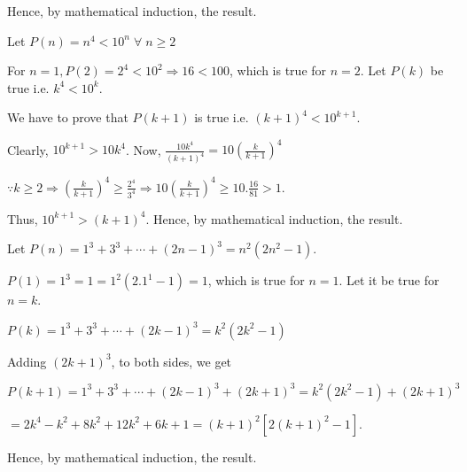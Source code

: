   Hence, by mathematical induction, the result.
\item Let $P(n) = n^4 < 10^n\;\forall\;n\geq 2$

  For $n = 1, P(2) = 2^4 < 10^2 \Rightarrow 16 < 100$, which is true for $n = 2$. Let $P(k)$ be true
  i.e. $k^4 < 10^k$.

  We have to prove that $P(k + 1)$ is true i.e. $(k + 1)^4 < 10^{k + 1}$.

  Clearly, $10^{k + 1} > 10k^4$. Now, $\frac{10k^4}{(k + 1)^4} = 10\left(\frac{k}{k + 1}\right)^4$

  $\because k\geq 2\Rightarrow \left(\frac{k}{k + 1}\right)^4\geq \frac{2^4}{3^4}\Rightarrow
  10\left(\frac{k}{k + 1}\right)^4 \geq 10.\frac{16}{81} > 1$.

  Thus, $10^{k + 1} > (k + 1)^4$. Hence, by mathematical induction, the result.
\item Let $P(n) = 1^3 + 3^3 + \cdots + (2n - 1)^3 = n^2(2n^2 - 1)$.

  $P(1) = 1^3 = 1 = 1^2(2.1^1 - 1) = 1$, which is true for $n = 1$. Let it be true for $n = k$.

  $P(k) = 1^3 + 3^3 + \cdots + (2k - 1)^3 = k^2(2k^2 - 1)$

  Adding $(2k + 1)^3$, to both sides, we get

  $P(k + 1) = 1^3 + 3^3 + \cdots + (2k - 1)^3 + (2k + 1)^3 = k^2(2k^2 - 1) + (2k + 1)^3$

  $= 2k^4 - k^2 + 8k^2 + 12k^2 + 6k + 1 = (k + 1)^2[2(k + 1)^2 - 1]$.

  Hence, by mathematical induction, the result.
\stopitemize